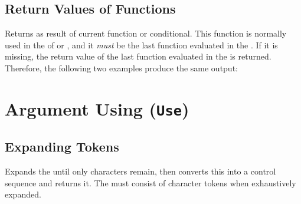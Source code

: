 \documentclass[oneside]{book}
\begin{document}
\section{Return Values of Functions}

\begin{function}{\Return}
\begin{syntax}
 
\end{syntax}
Returns  as result of current function or conditional.
This function is normally used in the  of 
or , and it \emph{must} be the last function evaluated in the .
If it is missing, the return value of the last function evaluated in the 
is returned. Therefore, the following two examples produce the same output:
\begin{codehigh}
\IgnoreSpacesOn
\PrgNewFunction {} {
  \IntSet {}
  \Return { \Value \lTmpaInt }
}
\IgnoreSpacesOff
{}
\end{codehigh}
\begin{codehigh}
\IgnoreSpacesOn
\PrgNewFunction {} {
  \IntSet {}
  \Value \lTmpaInt
}
\IgnoreSpacesOff
{}
\end{codehigh}
\end{function}

\chapter{Argument Using (\texttt{Use})}

\section{Expanding Tokens}

\begin{function}{\Name}
\begin{syntax}
 
\end{syntax}
Expands the  until only characters
remain, then converts this into a control sequence and returns it.
The  must consist of character tokens %
when exhaustively expanded.%
\end{function}
\end{document}
